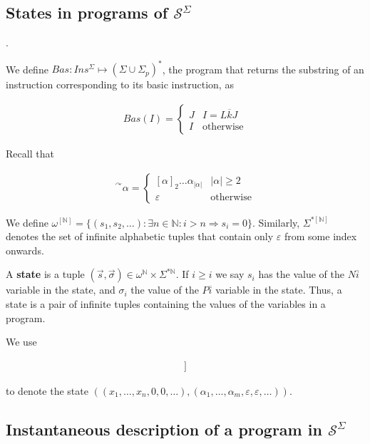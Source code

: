 \documentclass[a4paper, 12pt]{article}
\begin{document}
\subsection{States in programs of $\mathcal{S}^{\Sigma}$}.

We define $Bas : Ins^{\Sigma} \mapsto (\Sigma \cup \Sigma_p)^{*}$, the program
that returns the substring of an instruction corresponding to its basic
instruction, as 

\begin{align*}
    Bas(I) = \begin{cases}
        J & I = L \overline{k} J \\ 
        I & \text{otherwise}
    \end{cases}
\end{align*}

Recall that 

\begin{align*}
    {}^{\curvearrowright} \alpha = \begin{cases}
        [\alpha]_2 \ldots \alpha_|\alpha| & |\alpha| \geq 2 \\ 
        \varepsilon & \text{otherwise}
    \end{cases}
\end{align*}

We define $\omega^{[ \mathbb{N} ]} = \{ (s_1, s_2, \ldots) : \exists n \in
\mathbb{N} : i > n \Rightarrow s_i = 0 \}$. Similarly, $\Sigma^{*[ \mathbb{N} ]}$ denotes the set of infinite alphabetic
tuples that contain only $\varepsilon$ from some index onwards.

A \textbf{state} is a tuple $(\overrightarrow{s}, \overrightarrow{\sigma}) \in
\omega^{\mathbb{N}} \times \Sigma^{*\mathbb{N}}$. If $i \geq i$ we say $s_i$ has
the value of the ${N} \overline{i}$ variable in the state, and $\sigma_i$ the
value of the $P \overline{i}$ variable in the state. Thus, a state is a pair of
infinite tuples containing the values of the variables in a program.

We use 

\begin{align*}
    [\![ x_1, \ldots x_n, ~ \alpha_1, \ldots, \alpha_m ]\!]
\end{align*}

to denote the state $\left( (x_1, \ldots, x_n, 0, 0, \ldots), (\alpha_1, \ldots,
\alpha_m, \varepsilon, \varepsilon,\ldots) \right) $.

\subsection{Instantaneous description of a program in $\mathcal{S}^{\Sigma}$}
\end{document}
